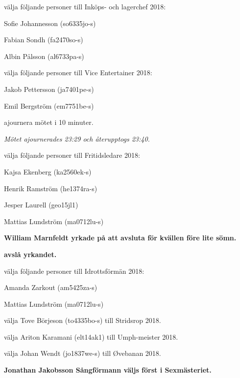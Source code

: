 \documentclass[10pt]{article}
\begin{document}
\begin{paragrafer}
\begin{paralist}
\newpage

    \Mba välja följande personer till Inköps- och lagerchef 2018:
    \begin{tightdashlist}
        \item Sofie Johannesson (so6335jo-s)
        \item Fabian Sondh (fa2470so-s)
        \item Albin Pålsson (al6733pa-s)
    \end{tightdashlist}

    \Mba välja följande personer till Vice Entertainer 2018:
    \begin{tightdashlist}
        \item Jakob Pettersson (ja7401pe-s)
        \item Emil Bergström (em7751be-s)
    \end{tightdashlist}

    \Mba ajournera mötet i 10 minuter.

    \emph{Mötet ajournerades 23:29 och återupptogs 23:40.}

    \Mba välja följande personer till Fritidsledare 2018:
    \begin{tightdashlist}
        \item Kajsa Ekenberg (ka2560ek-s)
        \item Henrik Ramström (he1374ra-s)
        \item Jesper Laurell  (geo15jl1)
        \item Mattias Lundström (ma0712lu-s)
    \end{tightdashlist}

    \textbf{William Marnfeldt yrkade på att avsluta för kvällen före lite sömn.}

    \textbf{\Mba avslå yrkandet.}

    \Mba välja följande personer till Idrottsförmän 2018:
    \begin{tightdashlist}
        \item Amanda Zarkout (am5425za-s)
        \item Mattias Lundström (ma0712lu-s)
    \end{tightdashlist}

    \Mba välja Tove Börjeson (to4335bo-s) till Stridsrop 2018.

    \Mba välja Ariton Karamani (elt14ak1) till Umph-meister 2018.

    \Mba välja Johan Wendt (jo1837we-s) till Øvebanan 2018.

    \textbf{Jonathan Jakobsson \ypa Sångförmann väljs först i Sexmästeriet.}


\end{paralist}
\end{paragrafer}
\end{document}
